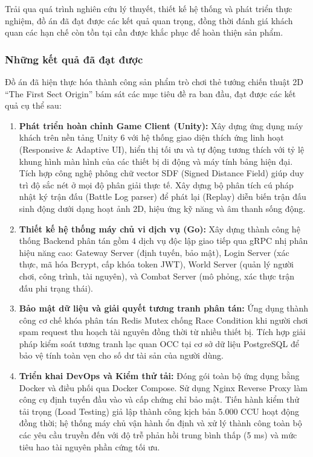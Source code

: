 \documentclass[../Project.tex]{subfiles}
\begin{document}
Trải qua quá trình nghiên cứu lý thuyết, thiết kế hệ thống và phát triển thực nghiệm, đồ án đã đạt được các kết quả quan trọng, đồng thời đánh giá khách quan các hạn chế còn tồn tại cần được khắc phục để hoàn thiện sản phẩm.

\subsubsection{Những kết quả đã đạt được}

Đồ án đã hiện thực hóa thành công sản phẩm trò chơi thẻ tướng chiến thuật 2D ``The First Sect Origin'' bám sát các mục tiêu đề ra ban đầu, đạt được các kết quả cụ thể sau:
\begin{enumerate}
    \item \textbf{Phát triển hoàn chỉnh Game Client (Unity):} Xây dựng ứng dụng máy khách trên nền tảng Unity 6 với hệ thống giao diện thích ứng linh hoạt (Responsive \& Adaptive UI), hiển thị tối ưu và tự động tương thích với tỷ lệ khung hình màn hình của các thiết bị di động và máy tính bảng hiện đại. Tích hợp công nghệ phông chữ vector SDF (Signed Distance Field) giúp duy trì độ sắc nét ở mọi độ phân giải thực tế. Xây dựng bộ phân tích cú pháp nhật ký trận đấu (Battle Log parser) để phát lại (Replay) diễn biến trận đấu sinh động dưới dạng hoạt ảnh 2D, hiệu ứng kỹ năng và âm thanh sống động.
    \item \textbf{Thiết kế hệ thống máy chủ vi dịch vụ (Go):} Xây dựng thành công hệ thống Backend phân tán gồm 4 dịch vụ độc lập giao tiếp qua gRPC nhị phân hiệu năng cao: Gateway Server (định tuyến, bảo mật), Login Server (xác thực, mã hóa Bcrypt, cấp khóa token JWT), World Server (quản lý người chơi, công trình, tài nguyên), và Combat Server (mô phỏng, xác thực trận đấu phi trạng thái).
    \item \textbf{Bảo mật dữ liệu và giải quyết tương tranh phân tán:} Ứng dụng thành công cơ chế khóa phân tán Redis Mutex chống Race Condition khi người chơi spam request thu hoạch tài nguyên đồng thời từ nhiều thiết bị. Tích hợp giải pháp kiểm soát tương tranh lạc quan OCC tại cơ sở dữ liệu PostgreSQL để bảo vệ tính toàn vẹn cho số dư tài sản của người dùng.
    \item \textbf{Triển khai DevOps và Kiểm thử tải:} Đóng gói toàn bộ ứng dụng bằng Docker và điều phối qua Docker Compose. Sử dụng Nginx Reverse Proxy làm công cụ định tuyến đầu vào và cấp chứng chỉ bảo mật. Tiến hành kiểm thử tải trọng (Load Testing) giả lập thành công kịch bản 5.000 CCU hoạt động đồng thời; hệ thống máy chủ vận hành ổn định và xử lý thành công toàn bộ các yêu cầu truyền đến với độ trễ phản hồi trung bình thấp (5 ms) và mức tiêu hao tài nguyên phần cứng tối ưu.
\end{enumerate}
\end{document}
